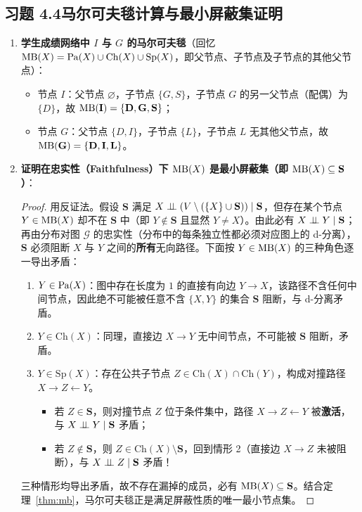 \subsection*{习题 4.4\quad 马尔可夫毯计算与最小屏蔽集证明}
\begin{enumerate}[label=(\arabic*), leftmargin=1.8em]
  \item \textbf{学生成绩网络中 $I$ 与 $G$ 的马尔可夫毯}（回忆 $\operatorname{MB}(X) = \operatorname{Pa}(X) \cup \mathrm{Ch}(X) \cup \mathrm{Sp}(X)$，即父节点、子节点及子节点的其他父节点）：
  \begin{itemize}
    \item 节点 $I$：父节点 $\varnothing$，子节点 $\{G, S\}$，子节点 $G$ 的另一父节点（配偶）为 $\{D\}$，故 $\mathbf{\operatorname{MB}(I) = \{D, G, S\}}$；
    \item 节点 $G$：父节点 $\{D, I\}$，子节点 $\{L\}$，子节点 $L$ 无其他父节点，故 $\mathbf{\operatorname{MB}(G) = \{D, I, L\}}$。
  \end{itemize}
  \item \textbf{证明在忠实性（Faithfulness）下 $\operatorname{MB}(X)$ 是最小屏蔽集（即 $\operatorname{MB}(X) \subseteq \mathbf{S}$）}：
  \begin{proof}
  用反证法。假设 $\mathbf{S}$ 满足 $X \perp\!\!\!\perp (V \setminus (\{X\} \cup \mathbf{S})) \mid \mathbf{S}$，但存在某个节点 $Y \in \operatorname{MB}(X)$ 却不在 $\mathbf{S}$ 中（即 $Y \notin \mathbf{S}$ 且显然 $Y \neq X$）。由此必有 $X \perp\!\!\!\perp Y \mid \mathbf{S}$；再由分布对图 $\mathcal{G}$ 的忠实性（分布中的每条独立性都必须对应图上的 d-分离），$\mathbf{S}$ 必须阻断 $X$ 与 $Y$ 之间的\textbf{所有}无向路径。下面按 $Y \in \operatorname{MB}(X)$ 的三种角色逐一导出矛盾：
  \begin{enumerate}[label=\textbf{情形 \arabic*:}, leftmargin=4.2em]
    \item $Y \in \operatorname{Pa}(X)$：图中存在长度为 $1$ 的直接有向边 $Y \to X$，该路径不含任何中间节点，因此绝不可能被任意不含 $\{X, Y\}$ 的集合 $\mathbf{S}$ 阻断，与 d-分离矛盾。
    \item $Y \in \mathrm{Ch}(X)$：同理，直接边 $X \to Y$ 无中间节点，不可能被 $\mathbf{S}$ 阻断，矛盾。
    \item $Y \in \mathrm{Sp}(X)$：存在公共子节点 $Z \in \mathrm{Ch}(X) \cap \mathrm{Ch}(Y)$，构成对撞路径 $X \to Z \leftarrow Y$。
    \begin{itemize}
      \item 若 $Z \in \mathbf{S}$，则对撞节点 $Z$ 位于条件集中，路径 $X \to Z \leftarrow Y$ 被\textbf{激活}，与 $X \perp\!\!\!\perp Y \mid \mathbf{S}$ 矛盾；
      \item 若 $Z \notin \mathbf{S}$，则 $Z \in \mathrm{Ch}(X) \setminus \mathbf{S}$，回到情形 2（直接边 $X \to Z$ 未被阻断），与 $X \perp\!\!\!\perp Z \mid \mathbf{S}$ 矛盾！
    \end{itemize}
  \end{enumerate}
  三种情形均导出矛盾，故不存在漏掉的成员，必有 $\operatorname{MB}(X) \subseteq \mathbf{S}$。结合定理~\ref{thm:mb}，马尔可夫毯正是满足屏蔽性质的唯一最小节点集。
  \end{proof}
\end{enumerate}

